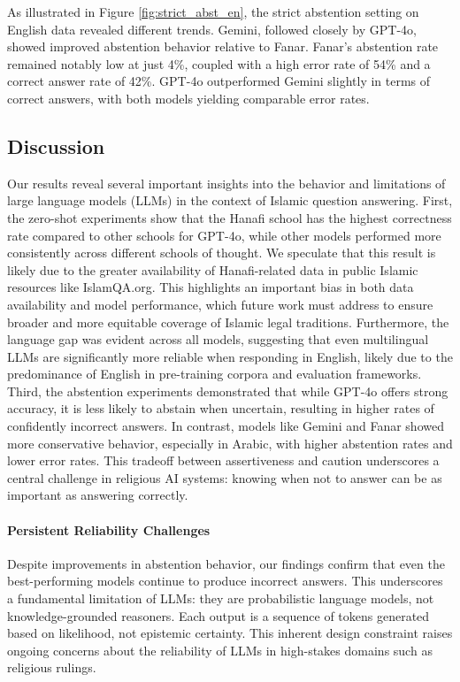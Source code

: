 \documentclass[letterpaper]{article}
\begin{document}
As illustrated in Figure \ref{fig:strict_abst_en}, the strict abstention setting on English data revealed different trends. Gemini, followed closely by GPT-4o, showed improved abstention behavior relative to Fanar. Fanar's abstention rate remained notably low at just 4\%, coupled with a high error rate of 54\% and a correct answer rate of 42\%. GPT-4o outperformed Gemini slightly in terms of correct answers, with both models yielding comparable error rates.

\subsection{Discussion}
Our results reveal several important insights into the behavior and limitations of large language models (LLMs) in the context of Islamic question answering. First,
the zero-shot experiments show that the Hanafi school has the highest correctness rate compared to other schools for GPT-4o, while other models performed more consistently across different schools of thought. We speculate that this result is likely due to the greater availability of Hanafi-related data in public Islamic resources like IslamQA.org. This highlights an important bias in both data availability and model performance, which future work must address to ensure broader and more equitable coverage of Islamic legal traditions. Furthermore, the language gap was evident across all models, suggesting that even multilingual LLMs are significantly more reliable when responding in English, likely due to the predominance of English in pre-training corpora and evaluation frameworks. 
Third, the abstention experiments demonstrated that while GPT-4o offers strong accuracy, it is less likely to abstain when uncertain, resulting in higher rates of confidently incorrect answers. In contrast, models like Gemini and Fanar showed more conservative behavior, especially in Arabic, with higher abstention rates and lower error rates. This tradeoff between assertiveness and caution underscores a central challenge in religious AI systems: knowing when not to answer can be as important as answering correctly.

\paragraph{Persistent Reliability Challenges}
Despite improvements in abstention behavior, our findings confirm that even the best-performing models continue to produce incorrect answers. This underscores a fundamental limitation of LLMs: they are probabilistic language models, not knowledge-grounded reasoners. Each output is a sequence of tokens generated based on likelihood, not epistemic certainty. This inherent design constraint raises ongoing concerns about the reliability of LLMs in high-stakes domains such as religious rulings.
\end{document}
